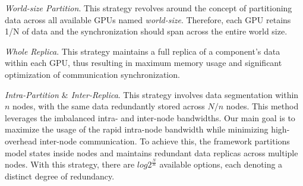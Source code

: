 \emph{World-size Partition}. This strategy revolves around the concept of partitioning data across all available GPUs named \emph{world-size}. 
Therefore, each GPU retains 1/N of data and the synchronization should span across the entire world size. 

\emph{Whole Replica}. This strategy maintains a full replica of a component's data within each GPU, thus resulting in maximum memory usage and significant optimization of communication synchronization.

\emph{Intra-Partition $\&$ Inter-Replica}. This strategy involves data segmentation within $n$ nodes, with the same data redundantly stored across $N/n$ nodes. 
This method leverages the imbalanced intra- and inter-node bandwidths. 
Our main goal is to maximize the usage of the rapid intra-node bandwidth while minimizing high-overhead inter-node communication. To achieve this, the framework partitions model states inside nodes and maintains redundant data replicas across multiple nodes. With this strategy, there are \( {log2^\frac{N}{R}} \) available options, each denoting a distinct degree of redundancy.


